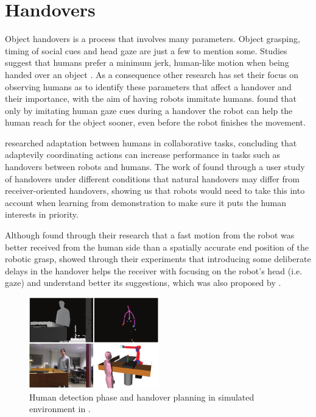 \section{Handovers}
Object handovers is a process that involves many parameters. Object grasping, timing of social cues and head gaze are just a few to mention some. Studies suggest that humans prefer a minimum jerk, human-like motion when being handed over an object \parencite{Huber2008} \parencite{Huber2008a}. As a consequence other research has set their focus on observing humans as to identify these parameters that affect a handover and their importance, with the aim of having robots immitate humans. \textcite{Moon2014} found that only by imitating human gaze cues during a handover the robot can help the human reach for the object sooner, even before the robot finishes the movement.

\textcite{Huang2015} researched adaptation between humans in collaborative tasks, concluding that adaptevily coordinating actions can increase performance in tasks such as handovers between robots and humans. The work of \textcite{Chan2015} found through a user study of handovers under different conditions that natural handovers may differ from receiver-oriented handovers, showing us that robots would need to take this into account when learning from demonstration to make sure it puts the human interests in priority.

Although \textcite{Koene2014} found through their research that a fast motion from the robot was better received from the human side than a spatially accurate end position of the robotic grasp, \textcite{Admoni2014} showed through their experiments that introducing some deliberate delays in the handover helps the receiver with focusing on the robot's head (i.e. gaze) and understand better its suggestions, which was also proposed by \parencite{Moon2014}.

\begin{figure}
	\centering
	\includegraphics[width=0.5\textwidth]{img/related-work/planning-simulation.png}
	\caption{Human detection phase and handover planning in simulated environment in \parencite{Aleotti2012}.}
\end{figure}

